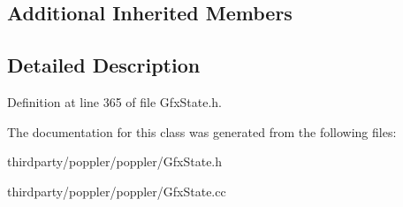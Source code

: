 \subsection*{Additional Inherited Members}


\subsection{Detailed Description}


Definition at line 365 of file Gfx\+State.\+h.



The documentation for this class was generated from the following files\+:\begin{DoxyCompactItemize}
\item 
thirdparty/poppler/poppler/Gfx\+State.\+h\item 
thirdparty/poppler/poppler/Gfx\+State.\+cc\end{DoxyCompactItemize}
